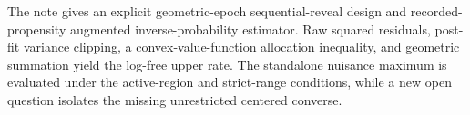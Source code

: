 The note gives an explicit geometric-epoch sequential-reveal design and recorded-propensity augmented inverse-probability estimator.  Raw squared residuals, post-fit variance clipping, a convex-value-function allocation inequality, and geometric summation yield the log-free upper rate.  The standalone nuisance maximum is evaluated under the active-region and strict-range conditions, while a new open question isolates the missing unrestricted centered converse.